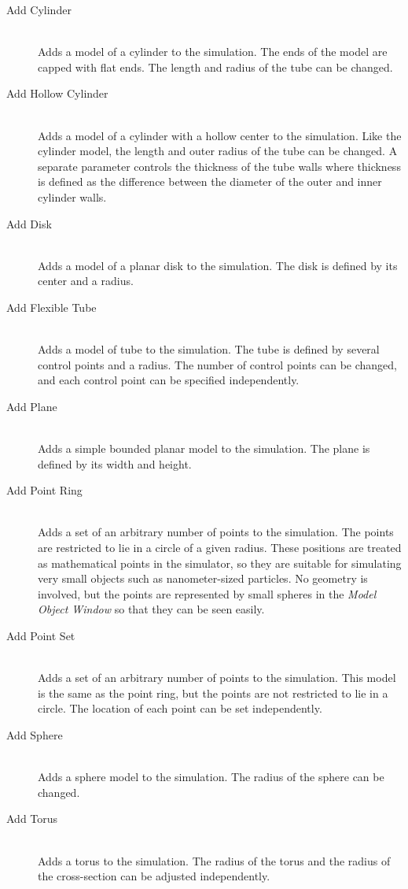 \documentclass[11pt,titlepage,twoside]{article}
\begin{document}
\begin{description}

  \item[Add Cylinder] \hfill \\
  Adds a model of a cylinder to the simulation. The ends of the model are capped with flat ends. The length and radius of the tube can be changed.
  
  \item[Add Hollow Cylinder] \hfill \\
  Adds a model of a cylinder with a hollow center to the simulation. Like the cylinder model, the length and outer radius of the tube can be changed. A separate parameter controls the thickness of the tube walls where thickness is defined as the difference between the diameter of the outer and inner cylinder walls.

  \item[Add Disk] \hfill \\
  Adds a model of a planar disk to the simulation. The disk is defined by its center and a radius.

  \item[Add Flexible Tube] \hfill \\
  Adds a model of tube to the simulation. The tube is defined by several control points and a radius. The number of control points can be changed, and each control point can be specified independently.
  
  \item[Add Plane] \hfill \\
  Adds a simple bounded planar model to the simulation. The plane is defined by its width and height.
  
  \item[Add Point Ring] \hfill \\
  Adds a set of an arbitrary number of points to the simulation. The points are restricted to lie in a circle of a given radius. These positions are treated as mathematical points in the simulator, so they are suitable for simulating very small objects such as nanometer-sized particles. No geometry is involved, but the points are represented by small spheres in the \emph{Model Object Window} so that they can be seen easily.
  
  \item[Add Point Set] \hfill \\
  Adds a set of an arbitrary number of points to the simulation. This model is the same as the point ring, but the points are not restricted to lie in a circle. The location of each point can be set independently.
  
  \item[Add Sphere] \hfill \\
  Adds a sphere model to the simulation. The radius of the sphere can be changed.

  \item[Add Torus] \hfill \\
  Adds a torus to the simulation. The radius of the torus and the radius of the cross-section can be adjusted independently.

\end{description}
\end{document}
